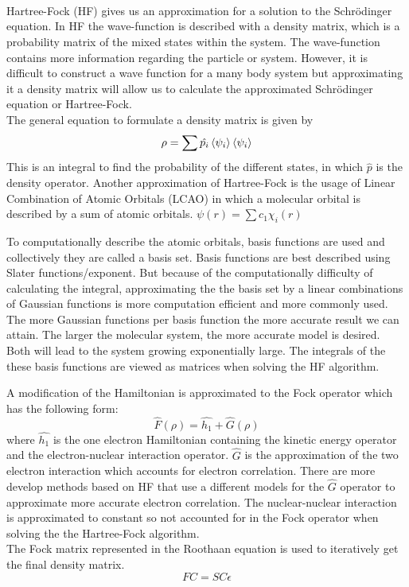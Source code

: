 \documentclass[twoside]{article}
\begin{document}
\\\\
[Since we want to introduced wave function and density matrix before Schrödinger\\
=[====this paragraph should move up ====] \\
Hartree-Fock (HF) gives us an approximation for a solution to the Schrödinger equation. In HF the wave-function is described with a density matrix, which is a probability matrix of the mixed states within the system. The wave-function contains more information regarding the particle or system. However, it is difficult to construct a wave function for a many body system but approximating it a density matrix will allow us to calculate the approximated Schrödinger equation or Hartree-Fock. \\  

The general equation to formulate a density matrix is given by
\[
\rho = \sum\hat{p_i}\braket{\psi_i}\braket{\psi_i}
\]
This is an integral to find the probability of the different states, in which $\hat{p}$ is the density operator. Another approximation of Hartree-Fock is the usage of Linear Combination of Atomic Orbitals (LCAO) in which a molecular orbital is described by a sum of atomic orbitals. $\psi(r) = \sum{c_1\chi_i(r)}$


To computationally describe the atomic orbitals, basis functions are used and collectively they are called a basis set. Basis functions are best described using Slater functions/exponent. But because of the computationally difficulty of calculating the integral, approximating the the basis set by a linear combinations of Gaussian functions is more computation efficient and more commonly used. The more Gaussian functions per basis function the more accurate result we can attain. The larger the molecular system, the more accurate model is desired. Both will lead to the system growing exponentially large. The integrals of the these basis functions are viewed as matrices when solving the HF algorithm.

A modification of the Hamiltonian is approximated to the Fock operator which has the following form:
\[
\hat{F}(\rho) = \hat{h_1} + \hat{G}(\rho)
\]
where $\hat{h_1}$ is the one electron Hamiltonian containing the kinetic energy operator and the electron-nuclear interaction operator. $\hat{G}$ is the approximation of the two electron interaction which accounts for electron correlation. There are more develop methods based on HF that use a different models for the $\hat{G}$ operator to approximate more accurate electron correlation. The nuclear-nuclear interaction is approximated to constant so not accounted for in the Fock operator when solving the the Hartree-Fock algorithm. \\ 
The Fock matrix represented in the Roothaan equation is used to iteratively get the final density matrix.
\[
FC = SC\epsilon
\]
\end{document}
